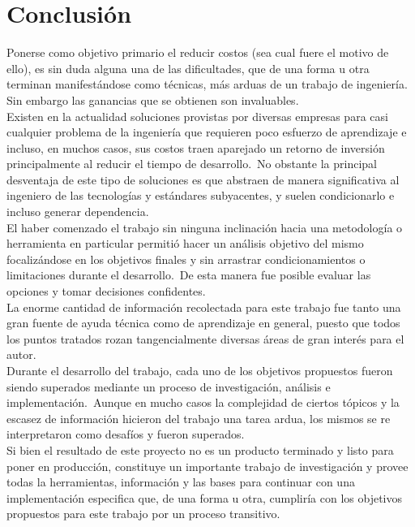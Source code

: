 \chapter{Conclusi\'on}

Ponerse como objetivo primario el reducir costos (sea cual fuere el motivo de
ello), es sin duda alguna una de las dificultades, que de una forma u otra
terminan manifest\'andose como t\'ecnicas, m\'as arduas de un trabajo de
ingenier\'ia. Sin embargo las ganancias que se obtienen son invaluables.\\

Existen en la actualidad soluciones provistas por diversas empresas para casi
cualquier problema de la ingenier\'ia que requieren poco esfuerzo de
aprendizaje e incluso, en muchos casos, sus costos traen aparejado un retorno
de inversi\'on principalmente al reducir el tiempo de desarrollo.\
No obstante la principal desventaja de este tipo de soluciones es que abstraen
de manera significativa al ingeniero de las tecnolog\'ias y est\'andares
subyacentes, y suelen condicionarlo e incluso generar dependencia.\\

El haber comenzado el trabajo sin ninguna inclinaci\'on hacia una metodolog\'ia
o herramienta en particular permiti\'o hacer un an\'alisis objetivo del mismo
focaliz\'andose en los objetivos finales y sin arrastrar condicionamientos
o limitaciones durante el desarrollo.\ 
De esta manera fue posible evaluar las opciones y tomar decisiones
confidentes.\\

La enorme cantidad de informaci\'on recolectada para este trabajo fue tanto una
gran fuente de ayuda t\'ecnica como de aprendizaje en general, puesto que
todos los puntos tratados rozan tangencialmente diversas \'areas de gran
inter\'es para el autor.\\

Durante el desarrollo del trabajo, cada uno de los objetivos propuestos fueron
siendo superados mediante un proceso de investigaci\'on, an\'alisis e
implementaci\'on.\
Aunque en mucho casos la complejidad de ciertos t\'opicos y la escasez de
informaci\'on hicieron del trabajo una tarea ardua, los mismos se re
interpretaron como desaf\'ios y fueron superados.\\

Si bien el resultado de este proyecto no es un producto terminado y listo para
poner en producci\'on, constituye un importante trabajo de investigaci\'on y
provee todas la herramientas, informaci\'on y las bases para continuar
con una implementaci\'on especifica que, de una forma u otra, cumplir\'ia con
los objetivos propuestos para este trabajo por un proceso transitivo.


